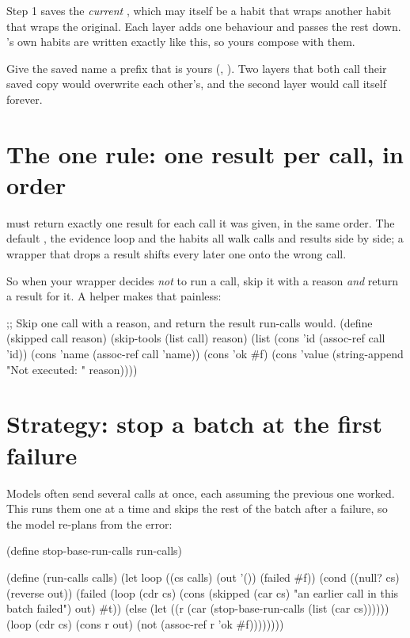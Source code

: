 Step 1 saves the \emph{current} , which may itself be a
habit that wraps another habit that wraps the original. Each layer adds one
behaviour and passes the rest down. \nodwyn's own habits are written
exactly like this, so yours compose with them.

\begin{tip}
Give the saved name a prefix that is yours (,
). Two layers that both call their saved copy
 would overwrite each other's, and the second layer
would call itself forever.
\end{tip}

\section{The one rule: one result per call, in order}

 must return exactly one result for each call it was
given, in the same order. The default , the evidence loop
and the habits all walk calls and results side by side; a wrapper that
drops a result shifts every later one onto the wrong call.

So when your wrapper decides \emph{not} to run a call, skip it with a
reason \emph{and} return a result for it. A helper makes that painless:

\begin{scm}
;; Skip one call with a reason, and return the result run-calls would.
(define (skipped call reason)
  (skip-tools (list call) reason)
  (list (cons 'id (assoc-ref call 'id))
        (cons 'name (assoc-ref call 'name))
        (cons 'ok #f)
        (cons 'value (string-append "Not executed: " reason))))
\end{scm}

\section{Strategy: stop a batch at the first failure}

Models often send several calls at once, each assuming the previous one
worked. This runs them one at a time and skips the rest of the batch after
a failure, so the model re-plans from the error:

\begin{scm}
(define stop-base-run-calls run-calls)

(define (run-calls calls)
  (let loop ((cs calls) (out '()) (failed #f))
    (cond ((null? cs) (reverse out))
          (failed
           (loop (cdr cs)
                 (cons (skipped (car cs) "an earlier call in this batch failed") out)
                 #t))
          (else
           (let ((r (car (stop-base-run-calls (list (car cs))))))
             (loop (cdr cs) (cons r out) (not (assoc-ref r 'ok #f))))))))
\end{scm}

